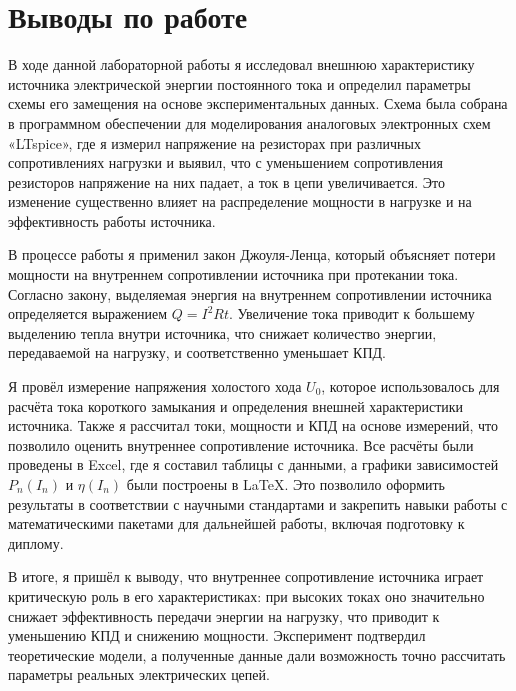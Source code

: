 \documentclass[a4paper]{article}
\begin{document}







\section{Выводы по работе}

В ходе данной лабораторной работы я исследовал внешнюю характеристику источника электрической 
энергии постоянного тока и определил параметры схемы его замещения на основе экспериментальных 
данных. Схема была собрана в программном обеспечении для моделирования аналоговых электронных 
схем «LTspice», где я измерил напряжение на резисторах при различных сопротивлениях нагрузки 
и выявил, что с уменьшением сопротивления резисторов напряжение на них падает, 
а ток в цепи увеличивается. Это изменение существенно влияет на распределение мощности в 
нагрузке и на эффективность работы источника.

В процессе работы я применил закон Джоуля-Ленца, 
который объясняет потери мощности на внутреннем сопротивлении источника при протекании тока. 
Согласно закону, выделяемая энергия на внутреннем сопротивлении источника определяется 
выражением \(Q = I^2 R t\). Увеличение тока приводит к большему выделению тепла внутри источника,
что снижает количество энергии, передаваемой на нагрузку, и соответственно уменьшает КПД.

Я провёл измерение напряжения холостого хода \( U_0 \), 
которое использовалось для расчёта тока короткого замыкания 
и определения внешней характеристики источника. 
Также я рассчитал токи, мощности и КПД на основе измерений, 
что позволило оценить внутреннее сопротивление источника. 
Все расчёты были проведены в Excel, где я составил таблицы с данными, а графики зависимостей 
\( P_n(I_n) \) и \( \eta(I_n) \) были построены в LaTeX. 
Это позволило оформить результаты в соответствии с научными стандартами и 
закрепить навыки работы с математическими пакетами для дальнейшей работы, 
включая подготовку к диплому.

В итоге, я пришёл к выводу, что внутреннее сопротивление источника играет критическую роль 
в его характеристиках: при высоких токах оно значительно снижает эффективность передачи 
энергии на нагрузку, что приводит к уменьшению КПД и снижению мощности. 
Эксперимент подтвердил теоретические модели, а полученные данные дали возможность точно 
рассчитать параметры реальных электрических цепей.
\end{document}
